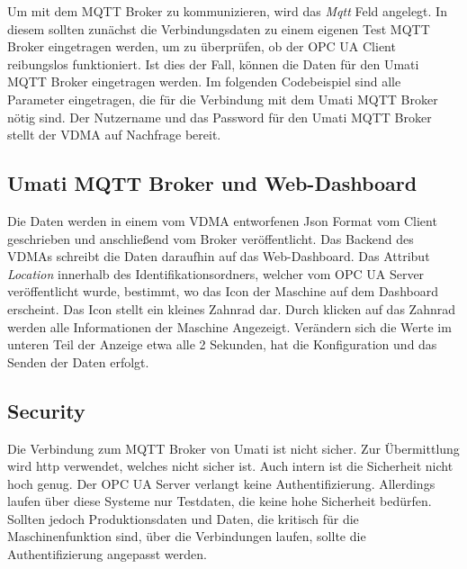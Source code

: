 \documentclass[a4paper, 12pt, oneside, toc=listofnumbered, bibliography=totoc]{scrbook}
\begin{document}
		
		
		Um mit dem MQTT Broker zu kommunizieren, wird das \textit{Mqtt} Feld angelegt. In diesem sollten zunächst die Verbindungsdaten zu einem eigenen Test MQTT Broker eingetragen werden, um zu überprüfen, ob der OPC UA Client reibungslos funktioniert. Ist dies der Fall, können die Daten für den Umati MQTT Broker eingetragen werden. Im folgenden Codebeispiel sind alle Parameter eingetragen, die für die Verbindung mit dem Umati MQTT Broker nötig sind. Der Nutzername und das Password für den Umati MQTT Broker stellt der VDMA auf Nachfrage bereit.
		
		
		
		\subsection{Umati MQTT Broker und Web-Dashboard}
		
		Die Daten werden in einem vom VDMA entworfenen Json Format vom Client geschrieben und anschließend vom Broker veröffentlicht. Das Backend des VDMAs schreibt die Daten daraufhin auf das Web-Dashboard. Das Attribut \textit{Location} innerhalb des Identifikationsordners, welcher vom OPC UA Server veröffentlicht wurde, bestimmt, wo das Icon der Maschine auf dem Dashboard erscheint. Das Icon stellt ein kleines Zahnrad dar. Durch klicken auf das Zahnrad werden alle Informationen der Maschine Angezeigt. Verändern sich die Werte im unteren Teil der Anzeige etwa alle 2 Sekunden, hat die Konfiguration und das Senden der Daten erfolgt.
		
	
		\subsection{Security}
		
		Die Verbindung zum MQTT Broker von Umati ist nicht sicher. Zur Übermittlung wird http verwendet, welches nicht sicher ist. Auch intern ist die Sicherheit nicht hoch genug. Der OPC UA Server verlangt keine Authentifizierung. Allerdings laufen über diese Systeme nur Testdaten, die keine hohe Sicherheit bedürfen. Sollten jedoch Produktionsdaten und Daten, die kritisch für die Maschinenfunktion sind, über die Verbindungen laufen, sollte die Authentifizierung angepasst werden. 
		
\end{document}
